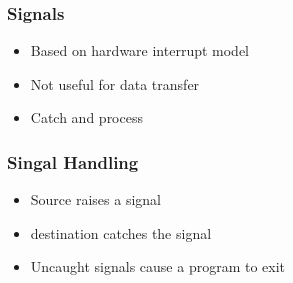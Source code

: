 \documentclass[pdftex]{beamer} %
\begin{document}
\begin{frame}
  \frametitle{Signals}
  \begin{itemize}
  \item Based on hardware interrupt model
  \item Not useful for data transfer
  \item Catch and process
  \end{itemize}
\end{frame}

\begin{frame}
  \frametitle{Singal Handling}
  \begin{itemize}
  \item Source raises a signal
  \item destination catches the signal 
  \item Uncaught signals cause a program to exit
  \end{itemize}
\end{frame}
\end{document}
